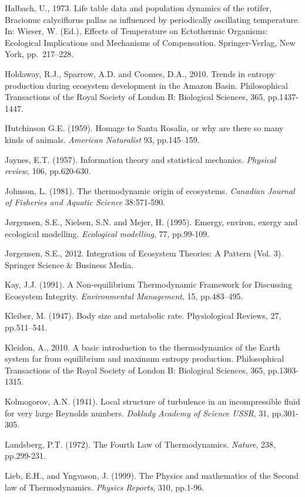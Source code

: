 \documentclass[11pt,letterpaper,]{paper}
\begin{document}
Halbach, U., 1973. Life table data and population dynamics of the
rotifer, Bracionuc calyciflorus pallas as influenced by periodically
oscillating temperature. In: Wieser, W. (Ed.), Effects of Temperature on
Ectothermic Organisms: Ecological Implications and Mechanisms of
Compensation. Springer-Verlag, New York, pp.~217--228.

Holdaway, R.J., Sparrow, A.D. and Coomes, D.A., 2010. Trends in entropy
production during ecosystem development in the Amazon Basin.
Philosophical Transactions of the Royal Society of London B: Biological
Sciences, 365, pp.1437-1447.

Hutchinson G.E. (1959). Homage to Santa Rosalia, or why are there so
many kinds of animals. \emph{American Naturalist} 93, pp.145--159.

Jaynes, E.T. (1957). Information theory and statistical mechanics.
\emph{Physical review}, 106, pp.620-630.

Johnson, L. (1981). The thermodynamic origin of ecosystems.
\emph{Canadian Journal of Fisheries and Aquatic Science} 38:571-590.

Jørgensen, S.E., Nielsen, S.N. and Mejer, H. (1995). Emergy, environ,
exergy and ecological modelling. \emph{Ecological modelling}, 77,
pp.99-109.

Jørgensen, S.E., 2012. Integration of Ecosystem Theories: A Pattern
(Vol. 3). Springer Science \& Business Media.

Kay, J.J. (1991). A Non-equilibrium Thermodynamic Framework for
Discussing Ecosystem Integrity. \emph{Environmental Management}, 15,
pp.483--495.

Kleiber, M. (1947). Body size and metabolic rate. Physiological Reviews,
27, pp.511--541.

Kleidon, A., 2010. A basic introduction to the thermodynamics of the
Earth system far from equilibrium and maximum entropy production.
Philosophical Transactions of the Royal Society of London B: Biological
Sciences, 365, pp.1303-1315.

Kolmogorov, A.N. (1941). Local structure of turbulence in an
incompressible fluid for very large Reynolds numbers. \emph{Doklady
Academy of Science USSR}, 31, pp.301-305.

Landsberg, P.T. (1972). The Fourth Law of Thermodynamics. \emph{Nature},
238, pp.299-231.

Lieb, E.H., and Yngvason, J. (1999). The Physics and mathematics of the
Second law of Thermodynamics. \emph{Physics Reports}, 310, pp.1-96.
\end{document}
